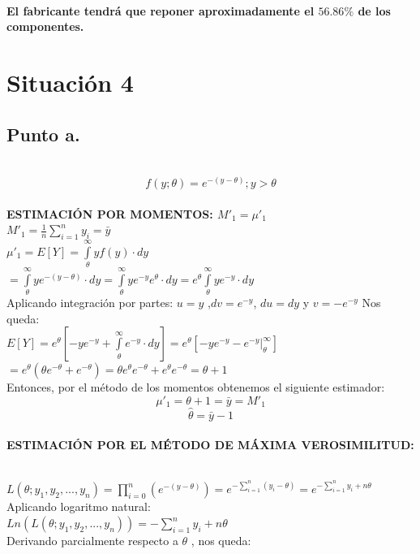 \documentclass[letterpaper,12pt,onecolumn,titlepage]{article}
\begin{document}
~\\ \textbf{El fabricante tendr\'{a} que reponer aproximadamente el $56.86\%$ de los componentes.}
\pagebreak\section{Situaci\'{o}n 4}
\subsection{Punto a.}
~\\ $$f(y;\theta)=e^{-(y-\theta)};  y>\theta$$  
~\\ \textbf{ESTIMACI\'{O}N POR MOMENTOS: $M'_1=\mu'_1$}
~\\ $M'_1=\frac{1}{n}\sum_{i=1}^{n}{y_{i}}=\bar{y}$
~\\ $\mu'_1=E[Y]=\int \limits_{\theta}^{\infty} y f(y) \cdot dy$
~\\ $=\int \limits_{\theta}^{\infty} ye^{-(y-\theta)} \cdot dy=\int \limits_{\theta}^{\infty} ye^{-y}e^\theta \cdot dy=e^\theta\int \limits_{\theta}^{\infty}ye^{-y} \cdot dy$
~\\ Aplicando integraci\'{o}n por partes: $u=y$ ,$dv=e^{-y}$, $du=dy$ y $v=-e^{-y}$ Nos queda:
~\\ $E[Y]=e^{\theta}[-ye^{-y}+\int \limits_{\theta}^{\infty}e^{-y} \cdot dy] =e^{\theta}[-ye^{-y}- e^{-y}|_{\theta}^{\infty}] $
~\\ $=e^{\theta}(\theta e^{-\theta}+e^{-\theta})=\theta e^{\theta}e^{-\theta}+e^{\theta}e^{-\theta}= \theta + 1 $ 
~\\ Entonces, por el m\'{e}todo de los momentos obtenemos el siguiente estimador:
~\\ $$\mu'_1=\theta + 1= \bar{y} = M'_1$$
 $$\hat{\theta}=\bar{y}-1$$
~\\ \textbf{ESTIMACI\'{O}N POR EL M\'{E}TODO DE M\'{A}XIMA VEROSIMILITUD:}

~\\ $L(\theta; y_{1},y_{2},...,y_{n})=\prod \limits_{i=0}^{n}(e^{-(y-\theta)})=e^{-\sum \limits_{i=1}^n {(y_{i}-\theta)}}=e^{-\sum \limits_{i=1}^n y_{i} + n\theta}$
~\\ Aplicando logaritmo natural:
~\\ $Ln(L(\theta; y_{1},y_{2},...,y_{n}))=-\sum \limits_{i=1}^n y_{i} + n\theta$
~\\ Derivando parcialmente respecto a $\theta$ , nos queda:
\end{document}
